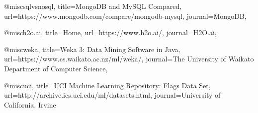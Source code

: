 @misc{sqlvsnosql, title={MongoDB and MySQL Compared}, url={https://www.mongodb.com/compare/mongodb-mysql}, journal={MongoDB}},

@misc{h2o.ai, title={Home}, url={https://www.h2o.ai/}, journal={H2O.ai}},

@misc{weka, title={Weka 3: Data Mining Software in Java}, url={https://www.cs.waikato.ac.nz/ml/weka/}, journal={The University of Waikato Department of Computer Science}},

@misc{uci, title={UCI Machine Learning Repository: Flags Data Set}, url={http://archive.ics.uci.edu/ml/datasets.html}, journal={University of California, Irvine}}